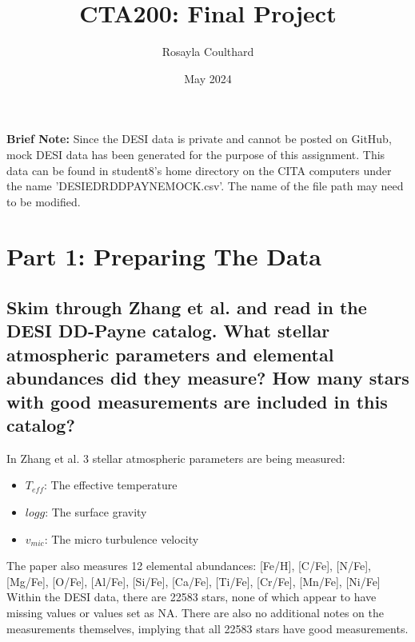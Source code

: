 \documentclass{article}
\title{CTA200: Final Project}
\author{Rosayla Coulthard}
\date{May 2024}
\begin{document}
\maketitle

\textbf{Brief Note:} Since the DESI data is private and cannot be posted on GitHub, mock DESI data has been generated for the purpose of this assignment. This data can be found in student8's home directory on the CITA computers under the name 'DESI\textunderscore EDR\textunderscore DDPAYNE\textunderscore MOCK.csv'. The name of the file path may need to be modified.

\section{Part 1: Preparing The Data}
\subsection{Skim through Zhang et al. and read in the DESI DD-Payne catalog. What stellar atmospheric parameters and elemental abundances did they measure? How many stars with good measurements are included in this catalog? 
}
In Zhang et al. 3 stellar atmospheric parameters are being measured:
\begin{itemize}
    \item $T_{eff}$: The effective temperature
    \item $log g$: The surface gravity
    \item $v_{mic}$: The micro turbulence velocity
\end{itemize}
The paper also measures 12 elemental abundances: [Fe/H], [C/Fe], [N/Fe], [Mg/Fe], [O/Fe], [Al/Fe], [Si/Fe], [Ca/Fe], [Ti/Fe], [Cr/Fe], [Mn/Fe], [Ni/Fe] 
Within the DESI data, there are 22583 stars, none of which appear to have missing values or values set as NA. There are also no additional notes on the measurements themselves, implying that all 22583 stars have good measurements.
\end{document}
